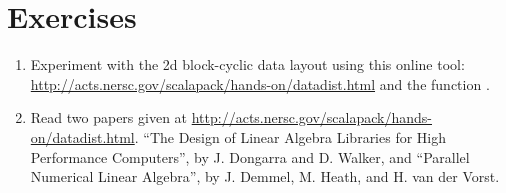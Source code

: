 \section{Exercises}
\label{sec:distributed_exercise}

\begin{enumerate}[label=\thechapter-\arabic*]

\item
Experiment with the 2d block-cyclic data layout using this online tool: 
\url{http://acts.nersc.gov/scalapack/hands-on/datadist.html} and the 
 function .

\item
Read two papers given at
\url{http://acts.nersc.gov/scalapack/hands-on/datadist.html}.
``The Design of Linear Algebra Libraries for High Performance Computers'',
by J. Dongarra and D. Walker, and
``Parallel Numerical Linear Algebra'',
by J. Demmel, M. Heath, and H. van der Vorst.

\end{enumerate}
